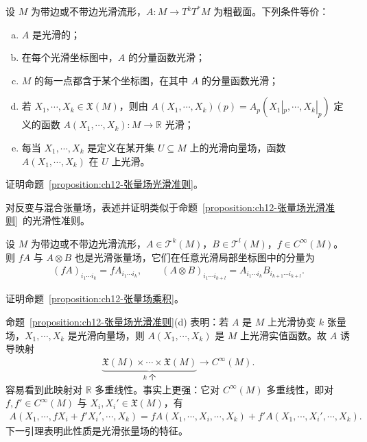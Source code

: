 \documentclass[../../main.tex]{subfiles}
\begin{document}
\begin{proposition}[张量场的光滑性准则]\label{proposition:ch12-张量场光滑准则}
设 $M$ 为带边或不带边光滑流形，$A\colon M\to T^kT^*M$ 为粗截面。下列条件等价：
\begin{enumerate}[(a)]
\item $A$ 是光滑的；
\item 在每个光滑坐标图中，$A$ 的分量函数光滑；
\item $M$ 的每一点都含于某个坐标图，在其中 $A$ 的分量函数光滑；
\item 若 $X_1,\cdots ,X_k\in\mathfrak X(M)$，则由 $A(X_1,\cdots ,X_k)(p)=A_p(X_1|_p,\cdots ,X_k|_p)$ 定义的函数 $A(X_1,\cdots ,X_k)\colon M\to\mathbb{R}$ 光滑；
\item 每当 $X_1,\cdots ,X_k$ 是定义在某开集 $U\subseteq M$ 上的光滑向量场，函数 $A(X_1,\cdots ,X_k)$ 在 $U$ 上光滑。
\end{enumerate}
\end{proposition}

\begin{exercise}\label{exercise:ch12-20}
证明命题~\ref{proposition:ch12-张量场光滑准则}。
\end{exercise}

\begin{exercise}\label{exercise:ch12-21}
对反变与混合张量场，表述并证明类似于命题~\ref{proposition:ch12-张量场光滑准则}~的光滑性准则。
\end{exercise}

\begin{proposition}\label{proposition:ch12-张量场乘积}
设 $M$ 为带边或不带边光滑流形，$A\in\mathcal T^k(M)$，$B\in\mathcal T^l(M)$，$f\in C^\infty(M)$。则 $fA$ 与 $A\otimes B$ 也是光滑张量场，它们在任意光滑局部坐标图中的分量为
\begin{align*}
(fA)_{i_1\cdots  i_k}=fA_{i_1\cdots  i_k},\qquad
(A\otimes B)_{i_1\cdots  i_{k+l}}=A_{i_1\cdots  i_k}B_{i_{k+1}\cdots  i_{k+l}}.
\end{align*}
\end{proposition}

\begin{exercise}\label{exercise:ch12-23}
证明命题~\ref{proposition:ch12-张量场乘积}。
\end{exercise}

命题~\ref{proposition:ch12-张量场光滑准则}(d) 表明：若 $A$ 是 $M$ 上光滑协变 $k$ 张量场，$X_1,\cdots ,X_k$ 是光滑向量场，则 $A(X_1,\cdots ,X_k)$ 是 $M$ 上光滑实值函数。故 $A$ 诱导映射
\begin{align*}
\underbrace{\mathfrak X(M)\times\cdots\times\mathfrak X(M)}_{k\text{ 个}}\to C^\infty(M).
\end{align*}
容易看到此映射对 $\mathbb{R}$ 多重线性。事实上更强：它对 $C^\infty(M)$ 多重线性，即对 $f,f'\in C^\infty(M)$ 与 $X_i,X_i'\in\mathfrak X(M)$，有
\begin{align*}
A(X_1,\cdots ,fX_i+f'X_i',\cdots ,X_k)=fA(X_1,\cdots ,X_i,\cdots ,X_k)+f'A(X_1,\cdots ,X_i',\cdots ,X_k).
\end{align*}
下一引理表明此性质是光滑张量场的特征。
\end{document}
